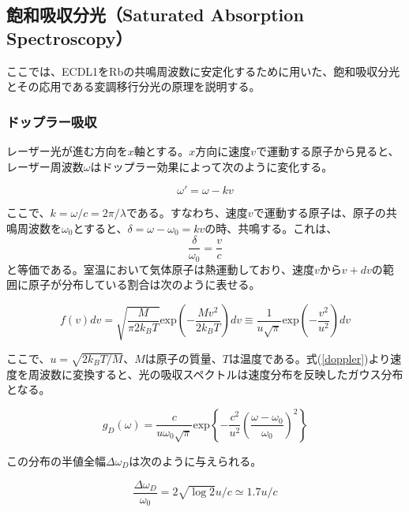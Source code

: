 \documentclass[dvipdfmx]{jsarticle}
\begin{document}
\clearpage
\subsection{飽和吸収分光（Saturated Absorption Spectroscopy）}
ここでは、ECDL1をRbの共鳴周波数に安定化するために用いた、飽和吸収分光とその応用である変調移行分光の原理を説明する。
\subsubsection{ドップラー吸収}
レーザー光が進む方向を$x$軸とする。$x$方向に速度$v$で運動する原子から見ると、レーザー周波数$\omega$はドップラー効果によって次のように変化する。

\begin{equation}
\omega' = \omega - kv
\end{equation}

ここで、$k = \omega / c = 2\pi / \lambda$である。すなわち、速度$v$で運動する原子は、原子の共鳴周波数を$\omega_0$とすると、$\delta = \omega - \omega_0 = kv$の時、共鳴する。これは、
\begin{equation}
\label{doppler}
    \frac{\delta}{\omega_0} = \frac{v}{c}
\end{equation}
と等価である。室温において気体原子は熱運動しており、速度$v$から$v + dv$の範囲に原子が分布している割合は次のように表せる。

\begin{equation}
    f(v)dv 
    = \sqrt{\frac{M}{\pi2k_BT}}\text{exp}\left( - \frac{Mv^2}{2k_BT} \right)dv
    \equiv \frac{1}{u\sqrt{\pi}}\text{exp} \left( - \frac{v^2}{u^2} \right)dv
\end{equation}

ここで、$u=\sqrt{2k_BT/M}$、$M$は原子の質量、$T$は温度である。式(\ref{doppler})より速度を周波数に変換すると、光の吸収スペクトルは速度分布を反映したガウス分布となる。

\begin{equation}
    g_D(\omega) = 
    \frac{c}{u\omega_0\sqrt{\pi}}
    \text{exp}
    \left\{
        -\frac{c^2}{u^2}
        \left(
            \frac{\omega - \omega_0}{\omega_0}
        \right) ^2
    \right\}
\end{equation}

この分布の半値全幅$\Delta\omega_D$は次のように与えられる。

\begin{equation}
\frac{\Delta\omega_D}{\omega_0} = 2\sqrt{\log2}u/c \simeq 1.7u/c
\end{equation}
\end{document}

